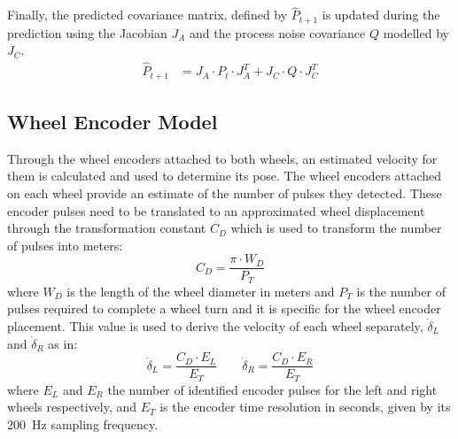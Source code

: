 
Finally, the predicted covariance matrix, defined by $\hat{P}_{t+1}$ is updated during the prediction using the Jacobian $J_A$ and the process noise covariance $Q$ modelled by $J_C$. %
\begin{align}
	\label{eq:cov-p}
	\hat{P}_{t+1} & = J_A \cdot P_t \cdot J_A^T + J_C \cdot Q \cdot J_C^T
\end{align}%


\subsection{Wheel Encoder Model}

\noindent
Through the wheel encoders attached to both wheels, an estimated velocity for them is calculated and used to determine its pose.
The wheel encoders attached on each wheel provide an estimate of the number of pulses they detected. These encoder pulses need to be translated to an approximated wheel displacement through the transformation constant $C_{D}$ which is used to transform the number of pulses into meters:%
\begin{equation}
C_{D} = \frac{\pi \cdot W_D }{P_T}
\label{eq:wheel_meter}
\end{equation} where $W_D$ is the length of the wheel diameter in meters and $P_T$ is the number of pulses required to complete a wheel turn and it is specific for the wheel encoder placement.
This value is used to derive the velocity of each wheel separately, $\dot \delta_L$ and $\dot \delta_R$ as in:
\begin{equation}
\dot \delta_{L} = \frac{C_D \cdot E_L}{E_T}  \qquad
\dot \delta_{R} = \frac{C_D \cdot E_R}{E_T}
\label{eq:wheel_disp}
\end{equation}
where $E_L$ and $E_R$ the number of identified encoder pulses for the left and right wheels respectively, and $E_T$ is the encoder time resolution in seconds, given by its \SI{200}{Hz} sampling frequency.


